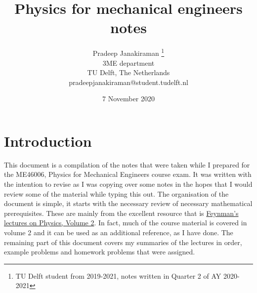 \documentclass[a4paper, reqno, 12pt, openbib]{article} %
\begin{document}
\title{Physics for mechanical engineers notes}
\author{Pradeep Janakiraman \thanks{TU Delft student from 2019-2021, notes written in Quarter 2 of AY 2020-2021}\\
3ME department\\
TU Delft, The Netherlands\\
pradeepjanakiraman@student.tudelft.nl}
\date{7 November 2020}
\maketitle
\newpage
\tableofcontents
\newpage
\section{Introduction}
This document is a compilation of the notes that were taken while I prepared for the ME46006, Physics for Mechanical Engineers course exam. It was written with the intention to revise as I was copying over some notes in the hopes that I would review some of the material while typing this out. The organisation of the document is simple, it starts with the necessary review of necessary mathematical prerequisites. These are mainly from the excellent resource that is \href{https://www.feynmanlectures.caltech.edu/II_toc.html}{Feynman's lectures on Physics, Volume 2}. In fact, much of the course material is covered in volume 2 and it can be used as an additional reference, as I have done. The remaining part of this document covers my summaries of the lectures in order, example problems and homework problems that were assigned.
\end{document}
